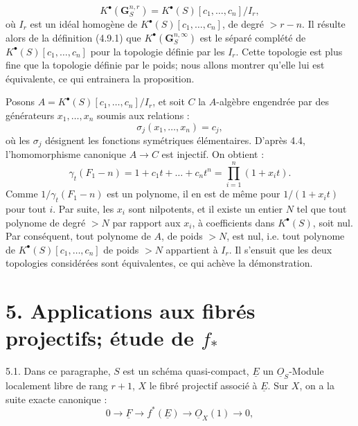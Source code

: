 
\[
  K^{\bullet}(\mathbf G_S^{n,r})=K^{\bullet}(S)[c_1,\ldots,c_n]/I_r,
\]
où \(I_r\) est un idéal homogène de \(K^{\bullet}(S)[c_1,\ldots,c_n]\), de
degré \(>r-n\). Il résulte alors de la définition (4.9.1) que \(K^{\bullet}(\mathbf G_S^{n,\infty})\) est le séparé complété de \(K^{\bullet}(S)[c_1,\ldots,c_n]\) pour la topologie définie par les \(I_r\). Cette topologie est plus fine que la topologie définie par le poids; nous allons montrer qu'elle lui est équivalente, ce qui entrainera la proposition.

Posons \(A=K^{\bullet}(S)[c_1,\ldots,c_n]/I_r\), et soit \(C\) la \(A\)-algèbre engendrée par des générateurs \(x_1,\ldots,x_n\) soumis aux relations :
\[
  \sigma_j(x_1,\ldots,x_n)=c_j,
\]
où les \(\sigma_j\) désignent les fonctions symétriques élémentaires. D'après 4.4, l'homomorphisme canonique \(A\to C\) est injectif. On obtient :
\[
  \gamma_t(F_1-n)
  =1+c_1t+\ldots+c_nt^n
  =\prod_{i=1}^n(1+x_it).
\]
Comme \(1/\gamma_t(F_1-n)\) est un polynome, il en est de même pour \(1/(1+x_it)\) pour tout \(i\). Par suite, les \(x_i\) sont nilpotents, et il existe un entier \(N\) tel que tout polynome de degré \(>N\) par rapport aux \(x_i\), à coefficients dans \(K^{\bullet}(S)\), soit nul. Par conséquent, tout polynome de \(A\), de poids \(>N\), est nul, i.e. tout polynome de \(K^{\bullet}(S)[c_1,\ldots,c_n]\) de poids \(>N\) appartient à \(I_r\). Il s'ensuit que les deux topologies considérées sont équivalentes, ce qui achève la démonstration.


\section*{5. Applications aux fibrés projectifs; étude de \texorpdfstring{$f_*$}{f*}}

5.1.
Dans ce paragraphe, $S$ est un schéma quasi-compact, $\underline{E}$ un $\underline{O}_S$-Module localement libre de rang $r+1$, $X$ le fibré projectif associé à $\underline{E}$. Sur $X$, on a la suite exacte canonique :
\[
  0\longrightarrow \underline{F}\longrightarrow f^*(\underline{E})\longrightarrow \underline{O}_X(1)\longrightarrow 0,
\]
